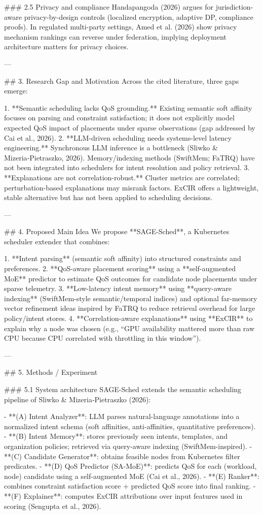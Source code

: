 ### 2.5 Privacy and compliance
Handapangoda (2026) argues for jurisdiction-aware privacy-by-design controls (localized encryption, adaptive DP, compliance proofs). In regulated multi-party settings, Amed et al. (2026) show privacy mechanism rankings can reverse under federation, implying deployment architecture matters for privacy choices.

---

## 3. Research Gap and Motivation
Across the cited literature, three gaps emerge:

1. **Semantic scheduling lacks QoS grounding.** Existing semantic soft affinity focuses on parsing and constraint satisfaction; it does not explicitly model expected QoS impact of placements under sparse observations (gap addressed by Cai et al., 2026).
2. **LLM-driven scheduling needs systems-level latency engineering.** Synchronous LLM inference is a bottleneck (Sliwko & Mizeria‑Pietraszko, 2026). Memory/indexing methods (SwiftMem; FaTRQ) have not been integrated into schedulers for intent resolution and policy retrieval.
3. **Explanations are not correlation-robust.** Cluster metrics are correlated; perturbation-based explanations may misrank factors. ExCIR offers a lightweight, stable alternative but has not been applied to scheduling decisions.

---

## 4. Proposed Main Idea
We propose **SAGE-Sched**, a Kubernetes scheduler extender that combines:

1. **Intent parsing** (semantic soft affinity) into structured constraints and preferences.
2. **QoS-aware placement scoring** using a **self-augmented MoE** predictor to estimate QoS outcomes for candidate node placements under sparse telemetry.
3. **Low-latency intent memory** using **query-aware indexing** (SwiftMem-style semantic/temporal indices) and optional far-memory vector refinement ideas inspired by FaTRQ to reduce retrieval overhead for large policy/intent stores.
4. **Correlation-aware explanations** using **ExCIR** to explain why a node was chosen (e.g., “GPU availability mattered more than raw CPU because CPU correlated with throttling in this window”).

---

## 5. Methods / Experiment

### 5.1 System architecture
SAGE-Sched extends the semantic scheduling pipeline of Sliwko & Mizeria‑Pietraszko (2026):

- **(A) Intent Analyzer**: LLM parses natural-language annotations into a normalized intent schema (soft affinities, anti-affinities, quantitative preferences).
- **(B) Intent Memory**: stores previously seen intents, templates, and organization policies; retrieved via query-aware indexing (SwiftMem-inspired).
- **(C) Candidate Generator**: obtains feasible nodes from Kubernetes filter predicates.
- **(D) QoS Predictor (SA-MoE)**: predicts QoS for each (workload, node) candidate using a self-augmented MoE (Cai et al., 2026).
- **(E) Ranker**: combines constraint satisfaction score + predicted QoS score into final ranking.
- **(F) Explainer**: computes ExCIR attributions over input features used in scoring (Sengupta et al., 2026).

